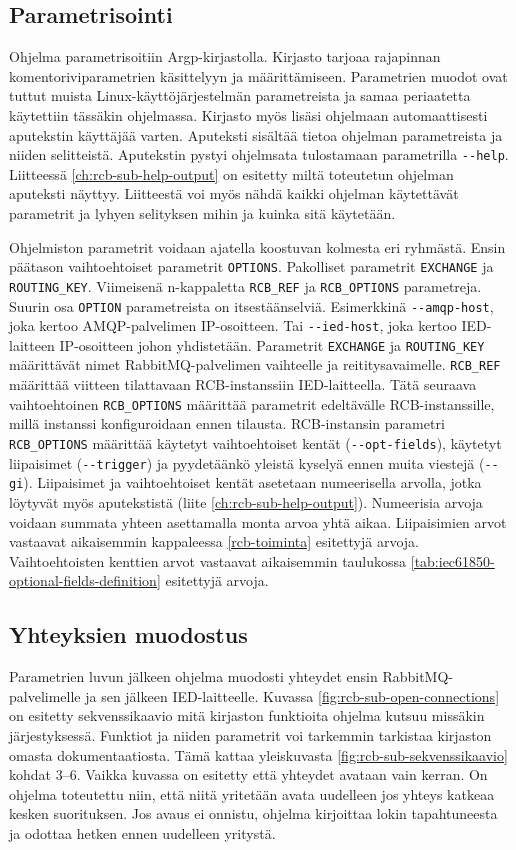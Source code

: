 \subsection{Parametrisointi}
Ohjelma parametrisoitiin Argp-kirjastolla. Kirjasto tarjoaa rajapinnan komentoriviparametrien käsittelyyn ja määrittämiseen. Parametrien muodot ovat tuttut muista Linux-käyttöjärjestelmän parametreista ja samaa periaatetta käytettiin tässäkin ohjelmassa. Kirjasto myös lisäsi ohjelmaan automaattisesti aputekstin käyttäjää varten. Aputeksti sisältää tietoa ohjelman parametreista ja niiden selitteistä. Aputekstin pystyi ohjelmsata tulostamaan parametrilla \texttt{-{}-help}. Liitteessä \ref{ch:rcb-sub-help-output} on esitetty miltä toteutetun ohjelman aputeksti näyttyy. Liitteestä voi myös nähdä kaikki ohjelman käytettävät parametrit ja lyhyen selityksen mihin ja kuinka sitä käytetään.

Ohjelmiston parametrit voidaan ajatella koostuvan kolmesta eri ryhmästä. Ensin päätason vaihtoehtoiset parametrit \texttt{OPTIONS}. Pakolliset parametrit \texttt{EXCHANGE} ja \texttt{ROUTING\_KEY}. Viimeisenä n-kappaletta \texttt{RCB\_REF} ja \texttt{RCB\_OPTIONS} parametreja. Suurin osa \texttt{OPTION} parametreista on itsestäänselviä. Esimerkkinä \texttt{-{}-amqp-host}, joka kertoo AMQP-palvelimen IP-osoitteen. Tai \texttt{-{}-ied-host}, joka kertoo IED-laitteen IP-osoitteen johon yhdistetään. Parametrit \texttt{EXCHANGE} ja \texttt{ROUTING\_KEY} määrittävät nimet RabbitMQ-palvelimen vaihteelle ja reititysavaimelle. \texttt{RCB\_REF} määrittää viitteen tilattavaan RCB-instanssiin IED-laitteella. Tätä seuraava vaihtoehtoinen \texttt{RCB\_OPTIONS} määrittää parametrit edeltävälle RCB-instanssille, millä instanssi konfiguroidaan ennen tilausta. RCB-instansin parametri \texttt{RCB\_OPTIONS} määrittää käytetyt vaihtoehtoiset kentät (\texttt{-{}-opt-fields}), käytetyt liipaisimet (\texttt{-{}-trigger}) ja pyydetäänkö yleistä kyselyä ennen muita viestejä (\texttt{-{}-gi}). Liipaisimet ja vaihtoehtoiset kentät asetetaan numeerisella arvolla, jotka löytyvät myös aputekstistä (liite \ref{ch:rcb-sub-help-output}). Numeerisia arvoja voidaan summata yhteen asettamalla monta arvoa yhtä aikaa. Liipaisimien arvot vastaavat aikaisemmin kappaleessa \ref{rcb-toiminta} esitettyjä arvoja. Vaihtoehtoisten kenttien arvot vastaavat aikaisemmin taulukossa \ref{tab:iec61850-optional-fields-definition} esitettyjä arvoja.

\subsection{Yhteyksien muodostus}
Parametrien luvun jälkeen ohjelma muodosti yhteydet ensin RabbitMQ-palvelimelle ja sen jälkeen IED-laitteelle. Kuvassa \ref{fig:rcb-sub-open-connections} on esitetty sekvenssikaavio mitä kirjaston funktioita ohjelma kutsuu missäkin järjestyksessä. Funktiot ja niiden parametrit voi tarkemmin tarkistaa kirjaston omasta dokumentaatiosta. Tämä kattaa yleiskuvasta \ref{fig:rcb-sub-sekvenssikaavio} kohdat 3--6. Vaikka kuvassa on esitetty että yhteydet avataan vain kerran. On ohjelma toteutettu niin, että niitä yritetään avata uudelleen jos yhteys katkeaa kesken suorituksen. Jos avaus ei onnistu, ohjelma kirjoittaa lokin tapahtuneesta ja odottaa hetken ennen uudelleen yritystä.

